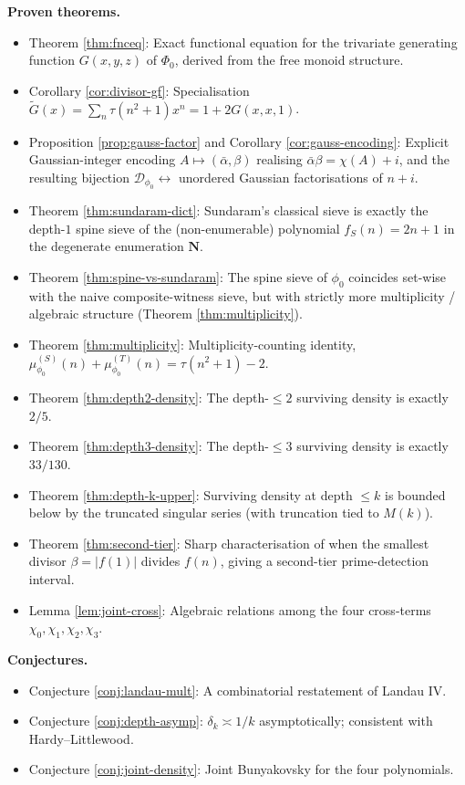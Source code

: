 \documentclass[11pt]{article}
\theoremstyle{definition}
\newcommand{\N}{\mathbf{N}}
\newcommand{\Dphi}{\mathcal{D}_{\phi_0}}
\newcommand{\Phzero}{\Phi_0}
\begin{document}
\textbf{Proven theorems.}
\begin{itemize}
\item Theorem \ref{thm:fnceq}: Exact functional equation for the trivariate generating function $G(x,y,z)$ of $\Phzero$, derived from the free monoid structure.
\item Corollary \ref{cor:divisor-gf}: Specialisation $\widetilde G(x) = \sum_n \tau(n^2+1) x^n = 1 + 2 G(x, x, 1)$.
\item Proposition \ref{prop:gauss-factor} and Corollary \ref{cor:gauss-encoding}: Explicit Gaussian-integer encoding $A \mapsto (\bar\alpha, \beta)$ realising $\bar\alpha\beta = \chi(A)+i$, and the resulting bijection $\Dphi \leftrightarrow $ unordered Gaussian factorisations of $n+i$.
\item Theorem \ref{thm:sundaram-dict}: Sundaram's classical sieve is exactly the depth-$1$ spine sieve of the (non-enumerable) polynomial $f_S(n) = 2n+1$ in the degenerate enumeration $\N$.
\item Theorem \ref{thm:spine-vs-sundaram}: The spine sieve of $\phi_0$ coincides set-wise with the naive composite-witness sieve, but with strictly more multiplicity / algebraic structure (Theorem \ref{thm:multiplicity}).
\item Theorem \ref{thm:multiplicity}: Multiplicity-counting identity, $\mu^{(S)}_{\phi_0}(n) + \mu^{(T)}_{\phi_0}(n) = \tau(n^2+1) - 2$.
\item Theorem \ref{thm:depth2-density}: The depth-$\le 2$ surviving density is exactly $2/5$.
\item Theorem \ref{thm:depth3-density}: The depth-$\le 3$ surviving density is exactly $33/130$.
\item Theorem \ref{thm:depth-k-upper}: Surviving density at depth $\le k$ is bounded below by the truncated singular series (with truncation tied to $M(k)$).
\item Theorem \ref{thm:second-tier}: Sharp characterisation of when the smallest divisor $\beta = |f(1)|$ divides $f(n)$, giving a second-tier prime-detection interval.
\item Lemma \ref{lem:joint-cross}: Algebraic relations among the four cross-terms $\chi_0, \chi_1, \chi_2, \chi_3$.
\end{itemize}

\textbf{Conjectures.}
\begin{itemize}
\item Conjecture \ref{conj:landau-mult}: A combinatorial restatement of Landau IV.
\item Conjecture \ref{conj:depth-asymp}: $\delta_k \asymp 1/k$ asymptotically; consistent with Hardy--Littlewood.
\item Conjecture \ref{conj:joint-density}: Joint Bunyakovsky for the four polynomials.
\end{itemize}
\end{document}
